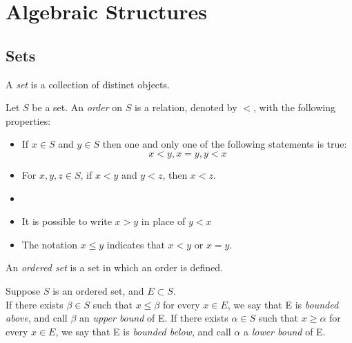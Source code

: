 \documentclass{report}
\begin{document}
	\section{Algebraic Structures}

		\subsection{Sets}

			\begin{defn}[Set] \label{def_set}
				A \emph{set} is a collection of distinct objects. 
			\end{defn}

			\begin{defn}[Order] \label{def_order}
				Let $S$ be a set. An \emph{order} on $S$ is a relation, denoted by $<$, with the following properties:
				\begin{itemize}
					\item If $x \in S$ and $y \in S$ then one and only one of the following statements is true:
					\begin{displaymath}
						x<y, x=y, y<x
					\end{displaymath}
					\item For $x,y,z \in S$, if $x<y$ and $y<z$, then $x<z$.
				\end{itemize}
			\end{defn}

			\begin{remark} \label{remark_order}
				\begin{itemize}
					\item[]
					\item It is possible to write $x>y$ in place of $y<x$
					\item The notation $x \leq y$ indicates that $x<y$ or $x=y$.
				\end{itemize}
			\end{remark}

		\begin{defn} \label{def_ordered_set}
			An \emph{ordered set} is a set in which an order is defined.
		\end{defn}

		\begin{defn}[Bound] \label{def_bound}
			Suppose $S$ is an ordered set, and $E\subset S$.\\
			If there exists $\beta \in S$ such that $x \leq \beta$ for every $x \in E$, we say that E is \emph{bounded above}, and call $\beta$ an \emph{upper bound} of E.
			If there exists $\alpha \in S$ such that $x \geq \alpha$ for every $x \in E$, we say that E is \emph{bounded below}, and call $\alpha$ a \emph{lower bound} of E.
		\end{defn}
\end{document}
